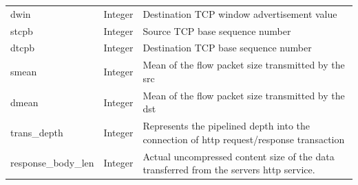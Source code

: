 \documentclass[conference, 10pt]{IEEEtran}
\begin{document}
\begin{table}[H]
\begin{tabularx}{\columnwidth}{@{}>{\ttfamily}l l >{\raggedright\arraybackslash}X@{}}
    dwin & Integer & Destination TCP window advertisement value \\ \addlinespace[4pt]
    stcpb & Integer & Source TCP base sequence number \\ \addlinespace[4pt]
    dtcpb & Integer & Destination TCP base sequence number \\ \addlinespace[4pt]
    smean & Integer & Mean of the flow packet size transmitted by the src \\ \addlinespace[4pt]
    dmean & Integer & Mean of the flow packet size transmitted by the dst \\ \addlinespace[4pt]
    trans\_depth & Integer & Represents the pipelined depth into the connection of http request/response transaction \\ \addlinespace[4pt]
    response\_body\_len & Integer & Actual uncompressed content size of the data transferred from the servers http service. \\
    \bottomrule
    \end{tabularx}
\end{table}
    
\end{document}
